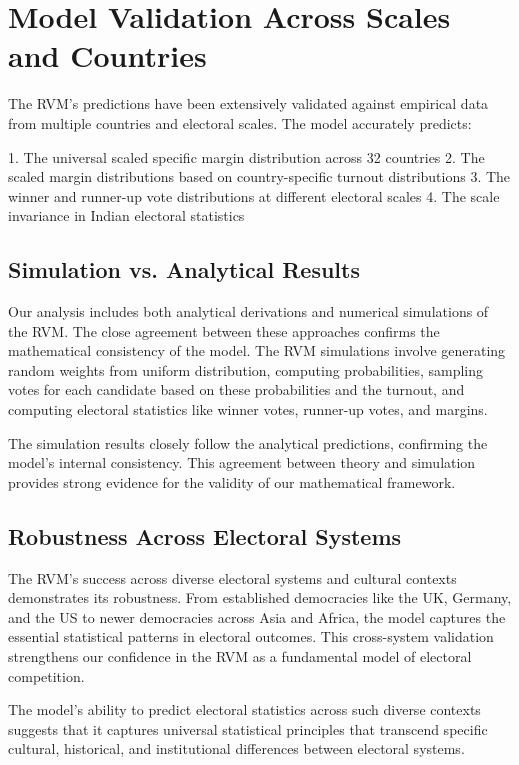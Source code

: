 \section{Model Validation Across Scales and Countries}

The RVM's predictions have been extensively validated against empirical data from multiple countries and electoral scales. The model accurately predicts:

1. The universal scaled specific margin distribution across 32 countries
2. The scaled margin distributions based on country-specific turnout distributions
3. The winner and runner-up vote distributions at different electoral scales
4. The scale invariance in Indian electoral statistics

\subsection{Simulation vs. Analytical Results}

Our analysis includes both analytical derivations and numerical simulations of the RVM. The close agreement between these approaches confirms the mathematical consistency of the model. The RVM simulations involve generating random weights from uniform distribution, computing probabilities, sampling votes for each candidate based on these probabilities and the turnout, and computing electoral statistics like winner votes, runner-up votes, and margins.

The simulation results closely follow the analytical predictions, confirming the model's internal consistency. This agreement between theory and simulation provides strong evidence for the validity of our mathematical framework.

\subsection{Robustness Across Electoral Systems}

The RVM's success across diverse electoral systems and cultural contexts demonstrates its robustness. From established democracies like the UK, Germany, and the US to newer democracies across Asia and Africa, the model captures the essential statistical patterns in electoral outcomes. This cross-system validation strengthens our confidence in the RVM as a fundamental model of electoral competition.

The model's ability to predict electoral statistics across such diverse contexts suggests that it captures universal statistical principles that transcend specific cultural, historical, and institutional differences between electoral systems.

